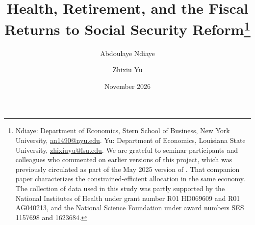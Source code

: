 \title{Health, Retirement, and the Fiscal Returns to Social Security Reform\thanks{Ndiaye: Department of Economics, Stern School of Business, New York University, \href{mailto:an1490@nyu.edu}{an1490@nyu.edu}. Yu: Department of Economics, Louisiana State University, \href{mailto:zhixiuyu@lsu.edu}{zhixiuyu@lsu.edu}. We are grateful to seminar participants and colleagues who commented on earlier versions of this project, which was previously circulated as part of the May 2025 version of \citet{ndiaye2026flexible}. That companion paper characterizes the constrained-efficient allocation in the same economy. The collection of data used in this study was partly supported by the National Institutes of Health under grant number R01 HD069609 and R01 AG040213, and the National Science Foundation under award numbers SES 1157698 and 1623684.}}
\author{Abdoulaye Ndiaye \and Zhixiu Yu}
\date{November 2026}

\maketitle
\thispagestyle{empty}
\vspace{-12pt}

